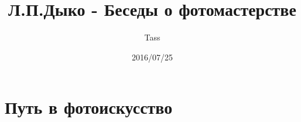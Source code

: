 \documentclass{article}
\begin{document}
\title{Л.П.Дыко - Беседы о фотомастерстве}
\author{Tass}
\date{2016/07/25}
\maketitle

\tableofcontents
\newpage
\section{Путь в фотоискусство}
\end{document}
